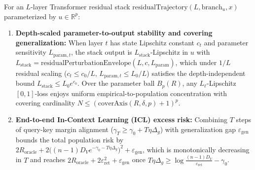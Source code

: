 \begin{lemma}\label{lem:transformer_generalization}
\leanok
{}
For an $L$-layer Transformer residual stack $\mathrm{residualTrajectory}(L, \mathrm{branch}_u, x)$ parameterized by $u\in\mathbb{R}^p$:
\begin{enumerate}
\item \textbf{Depth-scaled parameter-to-output stability and covering generalization:} When layer $t$ has state Lipschitz constant $c_t$ and parameter sensitivity $L_{\mathrm{param},t}$, the stack output is $L_{\mathrm{stack}}$-Lipschitz in $u$ with $L_{\mathrm{stack}} = \mathrm{residualPerturbationEnvelope}(L, c, L_{\mathrm{param}})$, which under $1/L$ residual scaling ($c_t \le c_0/L$, $L_{\mathrm{param},t} \le L_0/L$) satisfies the depth-independent bound $L_{\mathrm{stack}} \le L_0 e^{c_0}$. Over the parameter ball $B_p(R)$, any $L_\ell$-Lipschitz $[0,1]$-loss enjoys uniform empirical-to-population concentration with covering cardinality $N \le (\mathrm{coverAxis}(R,\delta,p)+1)^p$.
\item \textbf{End-to-end In-Context Learning (ICL) excess risk:} Combining $T$ steps of query-key margin alignment ($\gamma_T \ge \gamma_0 + T\eta\Delta_g$) with generalization gap $\varepsilon_{\mathrm{gen}}$ bounds the total population risk by $2 R_{\mathrm{oracle}} + 2\bigl((n-1)D_V e^{-\gamma_0 - T\eta\Delta_g}\bigr)^2 + \varepsilon_{\mathrm{gen}}$, which is monotonically decreasing in $T$ and reaches $2 R_{\mathrm{oracle}} + 2\varepsilon_{\mathrm{ret}}^2 + \varepsilon_{\mathrm{gen}}$ once $T\eta\Delta_g \ge \log\frac{(n-1)D_V}{\varepsilon_{\mathrm{ret}}} - \gamma_0$.

\end{enumerate}
\end{lemma}
